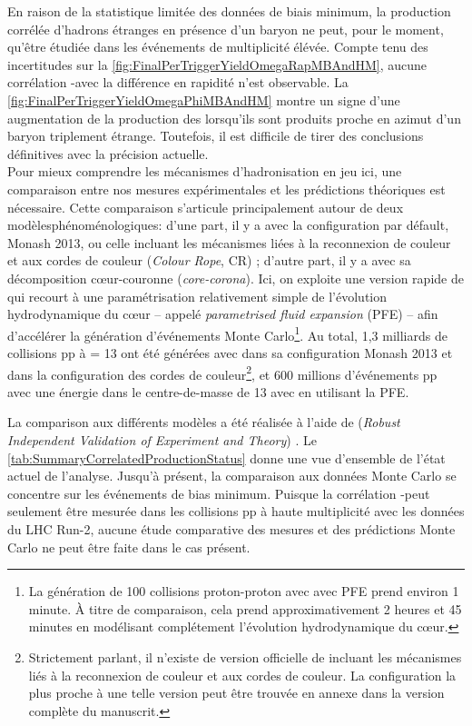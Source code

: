 En raison de la statistique limitée des données de biais minimum, la production corrélée d'hadrons étranges en présence d'un baryon \rmOmegaPM ne peut, pour le moment, qu'être étudiée dans les événements de multiplicité élévée. Compte tenu des incertitudes sur la \fig\ref{fig:FinalPerTriggerYieldOmegaRapMBAndHM}, aucune corrélation \rmOmegaPM-\rmPhiMes avec la différence en rapidité n'est observable. La \fig\ref{fig:FinalPerTriggerYieldOmegaPhiMBAndHM} montre un signe d'une augmentation de la production des \rmPhiMes lorsqu'ils sont produits proche en azimut d'un baryon triplement étrange. Toutefois, il est difficile de tirer des conclusions définitives avec la précision actuelle.\\


Pour mieux comprendre les mécanismes d'hadronisation en jeu ici, une comparaison entre nos mesures expérimentales et les prédictions théoriques est nécessaire. Cette comparaison s'articule principalement autour de deux modèles\break phénoménologiques: d'une part, il y a \Pythiaeight avec la configuration par défault, Monash 2013, ou celle incluant les mécanismes liées à la reconnexion de couleur et aux cordes de couleur (\textit{Colour Rope}, CR) ; d'autre part, il y a \EposFour avec sa décomposition c\oe{}ur-couronne (\textit{core-corona}). Ici, on exploite une version rapide de \EposFour qui recourt à une paramétrisation relativement simple de l'évolution hydrodynamique du c\oe{}ur -- appelé \textit{parametrised fluid expansion} (PFE) -- afin d'accélérer la génération d'événements Monte Carlo\footnote{La génération de 100 collisions proton-proton avec \EposFour avec PFE prend environ 1 minute. \`A titre de comparaison, cela prend approximativement 2 heures et 45 minutes en modélisant complétement l'évolution hydrodynamique du c\oe{}ur.}. Au total, 1,3 milliards de collisions pp à \sqrtS = 13 \tev ont été générées avec \Pythiaeight dans sa configuration Monash 2013 et dans la configuration des cordes de couleur\footnote{Strictement parlant, il n'existe de version officielle de \Pythia incluant les mécanismes liés à la reconnexion de couleur et aux cordes de couleur. La configuration la plus proche à une telle version peut être trouvée en annexe dans la version complète du manuscrit.}, et 600 millions d'événements pp avec une énergie dans le centre-de-masse de 13 \tev avec \EposFour en utilisant la PFE.

La comparison aux différents modèles a été réalisée à l'aide de \Rivet (\textit{Robust Independent Validation of Experiment and Theory}) \cite{hepforgeRivetParticlephysicsMC2023}. Le \tab\ref{tab:SummaryCorrelatedProductionStatus} donne une vue d'ensemble de l'état actuel de l'analyse. Jusqu'à présent, la comparaison aux données Monte Carlo se concentre sur les événements de bias minimum. Puisque la corrélation \rmOmegaPM-\rmPhiMes peut seulement être mesurée dans les collisions pp à haute multiplicité avec les données du LHC Run-2, aucune étude comparative des mesures et des prédictions Monte Carlo ne peut être faite dans le cas présent.

